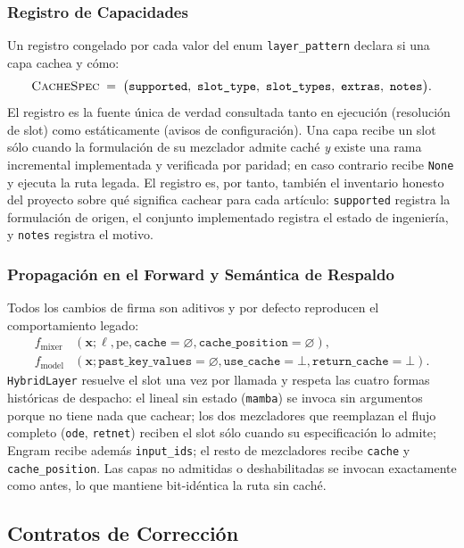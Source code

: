\subsubsection{Registro de Capacidades}

Un registro congelado por cada valor del enum \texttt{layer\_pattern} declara si una capa cachea y cómo:
\[
\textsc{CacheSpec} \;=\; \big(\texttt{supported},\ \texttt{slot\_type},\ \texttt{slot\_types},\ \texttt{extras},\ \texttt{notes}\big).
\]
El registro es la fuente única de verdad consultada tanto en ejecución (resolución de slot) como estáticamente (avisos de configuración). Una capa recibe un slot sólo cuando la formulación de su mezclador admite caché \emph{y} existe una rama incremental implementada y verificada por paridad; en caso contrario recibe \texttt{None} y ejecuta la ruta legada. El registro es, por tanto, también el inventario honesto del proyecto sobre qué significa cachear para cada artículo: \texttt{supported} registra la formulación de origen, el conjunto implementado registra el estado de ingeniería, y \texttt{notes} registra el motivo.

\subsubsection{Propagación en el Forward y Semántica de Respaldo}

Todos los cambios de firma son aditivos y por defecto reproducen el comportamiento legado:
\begin{align*}
f_{\text{mixer}}&(\mathbf{x}; \ell, \text{pe}, \texttt{cache}=\varnothing, \texttt{cache\_position}=\varnothing),\\
f_{\text{model}}&(\mathbf{x}; \texttt{past\_key\_values}=\varnothing, \texttt{use\_cache}=\bot, \texttt{return\_cache}=\bot).
\end{align*}
\texttt{HybridLayer} resuelve el slot una vez por llamada y respeta las cuatro formas históricas de despacho: el lineal sin estado (\texttt{mamba}) se invoca sin argumentos porque no tiene nada que cachear; los dos mezcladores que reemplazan el flujo completo (\texttt{ode}, \texttt{retnet}) reciben el slot sólo cuando su especificación lo admite; Engram recibe además \texttt{input\_ids}; el resto de mezcladores recibe \texttt{cache} y \texttt{cache\_position}. Las capas no admitidas o deshabilitadas se invocan exactamente como antes, lo que mantiene bit-idéntica la ruta sin caché.

\subsection{Contratos de Corrección}
\label{sec:kv-correctness}

